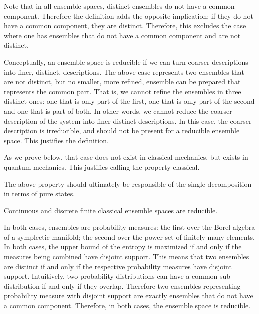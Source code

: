 \begin{justification}
	Note that in all ensemble spaces, distinct ensembles do not have a common component. Therefore the definition adds the opposite implication: if they do not have a common component, they are distinct. Therefore, this excludes the case where one has ensembles that do not have a common component and are not distinct.
	
	Conceptually, an ensemble space is reducible if we can turn coarser descriptions into finer, distinct, descriptions. The above case represents two ensembles that are not distinct, but no smaller, more refined, ensemble can be prepared that represents the common part. That is, we cannot refine the ensembles in three distinct ones: one that is only part of the first, one that is only part of the second and one that is part of both. In other words, we cannot reduce the coarser description of the system into finer distinct descriptions. In this case, the coarser description is irreducible, and should not be present for a reducible ensemble space. This justifies the definition.
	
	As we prove below, that case does not exist in classical mechanics, but exists in quantum mechanics. This justifies calling the property classical.
\end{justification}

\begin{remark}
	The above property should ultimately be responsible of the single decomposition in terms of pure states.
\end{remark}

\begin{prop}
	Continuous and discrete finite classical ensemble spaces are reducible.
\end{prop}

\begin{defn}
	In both cases, ensembles are probability measures: the first over the Borel algebra of a symplectic manifold; the second over the power set of finitely many elements. In both cases, the upper bound of the entropy is maximized if and only if the measures being combined have disjoint support. This means that two ensembles are distinct if and only if the respective probability measures have disjoint support. Intuitively, two probability distributions can have a common sub-distribution if and only if they overlap. Therefore two ensembles representing probability measure with disjoint support are exactly ensembles that do not have a common component. Therefore, in both cases, the ensemble space is reducible.
\end{defn}

